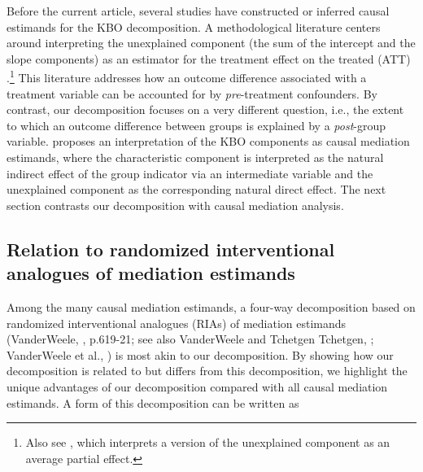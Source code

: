 \documentclass[12pt,a4paper]{article}
\begin{document}
Before the current article, several studies have constructed or inferred causal estimands for the KBO decomposition. A methodological literature centers around interpreting the unexplained component (the sum of the intercept and the slope components) as an estimator for the treatment effect on the treated (ATT) \citep{fortin_decomposition_2011, kline_oaxaca-blinder_2011, yamaguchi_decomposition_2015}.\footnote{Also see \citet{chernozhukov_sorted_2018}, which interprets a version of the unexplained component as an average partial effect.} This literature addresses how an outcome difference associated with a treatment variable can be accounted for by \emph{pre}-treatment confounders. By contrast, our decomposition focuses on a very different question, i.e., the extent to which an outcome difference between groups is explained by a \emph{post}-group variable. \citet{huber_causal_2015} proposes an interpretation of the KBO components as causal mediation estimands, where the characteristic component is interpreted as the natural indirect effect \citep{pearl_direct_2001} of the group indicator via an intermediate variable and the unexplained component as the corresponding natural direct effect. The next section contrasts our decomposition with causal mediation analysis.

\subsection{Relation to randomized interventional analogues of mediation estimands}
Among the many causal mediation estimands, a four-way decomposition based on randomized interventional analogues (RIAs) of mediation estimands (VanderWeele,  \citeyear{vanderweele_explanation_2015}, p.619-21; see also VanderWeele and Tchetgen Tchetgen, \citeyear{vanderweele_mediation_2017}; VanderWeele et al., \citeyear{vanderweele_effect_2014}) is most akin to our decomposition. By showing how our decomposition is related to but differs from this decomposition, we highlight the unique advantages of our decomposition compared with all causal mediation estimands. A form of this decomposition can be written as 
\end{document}
